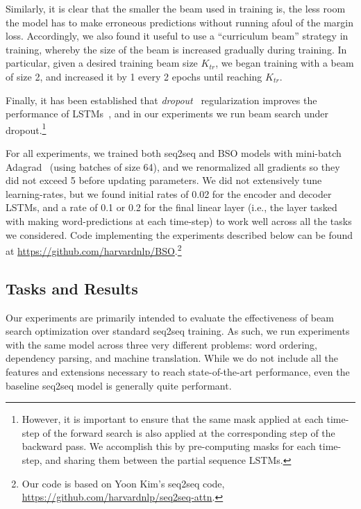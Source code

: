 Similarly, it is clear that the smaller the beam used in training is, the less room the model has to make erroneous predictions without running afoul of the margin loss. Accordingly, we also found it useful to use a ``curriculum beam'' strategy in training, whereby the size of the beam  is increased gradually during training. In particular, given a desired training beam size $K_{tr}$, we began training with a beam of size 2, and increased it by 1 every 2 epochs until reaching $K_{tr}$. 

Finally, it has been established that \textit{dropout}~\cite{srivastava14dropout} regularization improves the performance of LSTMs~\cite{pham14dropout,zaremba14rnn}, and in our experiments we run beam search under dropout.\footnote{However, it is important to ensure that the same mask applied at each time-step of the forward search is also applied at the corresponding step of the backward pass. We accomplish this by pre-computing masks for each time-step, and sharing them between the partial sequence LSTMs.}

For all experiments, we trained both seq2seq and BSO  models with mini-batch Adagrad~\cite{duchi2011adaptive} (using batches of size 64), and we renormalized all gradients so they did not exceed 5 before updating parameters. We did not extensively tune learning-rates, but we found initial rates of 0.02 for the encoder and decoder LSTMs, and a rate of 0.1 or 0.2 for
the final linear layer (i.e., the layer tasked with making word-predictions at each
time-step) to work well across all the tasks we considered. Code implementing the experiments described below can be found at \url{https://github.com/harvardnlp/BSO}.\footnote{Our code is based on Yoon Kim's seq2seq code, \url{https://github.com/harvardnlp/seq2seq-attn}.}

\subsection{Tasks and Results}
\label{sec:tasks}
Our experiments are primarily intended to evaluate the
effectiveness of beam search optimization over standard seq2seq training. As such, we run experiments with the same model across three very different problems: word ordering, dependency parsing, and machine translation. While we do not include all the features and extensions necessary to
reach state-of-the-art performance, even the baseline seq2seq model is generally quite performant.

